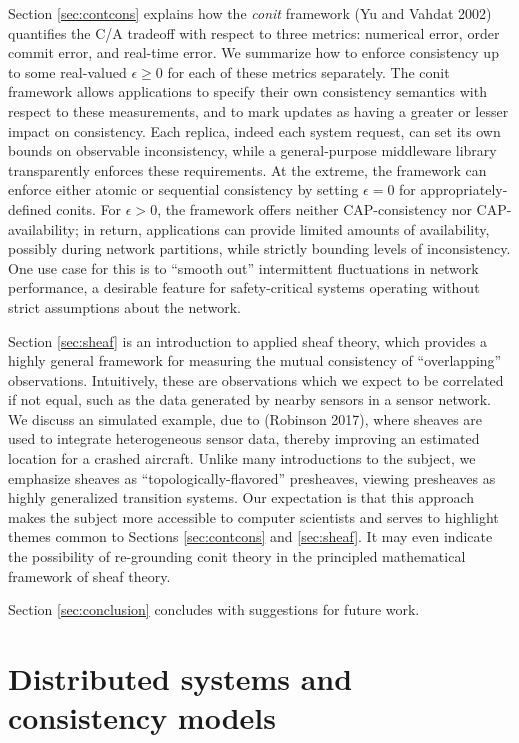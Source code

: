 \documentclass[]             %
{NASA}                       %
\theoremstyle{definition}
\begin{document}
Section \ref{sec:contcons} explains how the \emph{conit} framework (Yu
and Vahdat 2002) quantifies the C/A tradeoff with respect to three
metrics: numerical error, order commit error, and real-time error. We
summarize how to enforce consistency up to some real-valued
\(\epsilon \geq 0\) for each of these metrics separately. The conit
framework allows applications to specify their own consistency semantics
with respect to these measurements, and to mark updates as having a
greater or lesser impact on consistency. Each replica, indeed each
system request, can set its own bounds on observable inconsistency,
while a general-purpose middleware library transparently enforces these
requirements. At the extreme, the framework can enforce either atomic or
sequential consistency by setting \(\epsilon = 0\) for
appropriately-defined conits. For \(\epsilon > 0\), the framework offers
neither CAP-consistency nor CAP-availability; in return, applications
can provide limited amounts of availability, possibly during network
partitions, while strictly bounding levels of inconsistency. One use
case for this is to ``smooth out'' intermittent fluctuations in network
performance, a desirable feature for safety-critical systems operating
without strict assumptions about the network.

Section \ref{sec:sheaf} is an introduction to applied sheaf theory,
which provides a highly general framework for measuring the mutual
consistency of ``overlapping'' observations. Intuitively, these are
observations which we expect to be correlated if not equal, such as the
data generated by nearby sensors in a sensor network. We discuss an
simulated example, due to (Robinson 2017), where sheaves are used to
integrate heterogeneous sensor data, thereby improving an estimated
location for a crashed aircraft. Unlike many introductions to the
subject, we emphasize sheaves as ``topologically-flavored'' presheaves,
viewing presheaves as highly generalized transition systems. Our
expectation is that this approach makes the subject more accessible to
computer scientists and serves to highlight themes common to Sections
\ref{sec:contcons} and \ref{sec:sheaf}. It may even indicate the
possibility of re-grounding conit theory in the principled mathematical
framework of sheaf theory.

Section \ref{sec:conclusion} concludes with suggestions for future work.

\hypertarget{distributed-systems-and-consistency-models}{%
\section{Distributed systems and consistency
models}\label{distributed-systems-and-consistency-models}}
\end{document}
